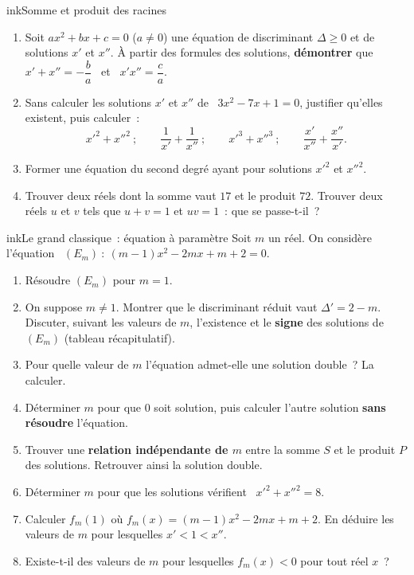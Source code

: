 \begin{exo}{ink}{Somme et produit des racines \demo\ }
\begin{enumerate}
  \item Soit $ax^2+bx+c=0$ ($a\neq0$) une équation de discriminant $\Delta\geq0$ et de solutions $x'$ et $x''$. À partir des formules des solutions, \textbf{démontrer} que \ $x'+x''=-\dfrac ba$ \ et \ $x'x''=\dfrac ca$.
  \item Sans calculer les solutions $x'$ et $x''$ de \ $3x^2-7x+1=0$, justifier qu'elles existent, puis calculer~:
  \[ x'^2+x''^2\ ;\qquad \frac1{x'}+\frac1{x''}\ ;\qquad x'^3+x''^3\ ;\qquad \frac{x'}{x''}+\frac{x''}{x'}. \]
  \item Former une équation du second degré ayant pour solutions $x'^2$ et $x''^2$.
  \item Trouver deux réels dont la somme vaut $17$ et le produit $72$. Trouver deux réels $u$ et $v$ tels que $u+v=1$ et $uv=1$~: que se passe-t-il~?
\end{enumerate}
\end{exo}

\begin{exo}{ink}{Le grand classique~: équation à paramètre }
Soit $m$ un réel. On considère l'équation \ $(E_m)~:\ (m-1)x^2-2mx+m+2=0$.
\begin{enumerate}
  \item Résoudre $(E_m)$ pour $m=1$.
  \item On suppose $m\neq1$. Montrer que le discriminant réduit vaut $\Delta'=2-m$. Discuter, suivant les valeurs de $m$, l'existence et le \textbf{signe} des solutions de $(E_m)$ (tableau récapitulatif).
  \item Pour quelle valeur de $m$ l'équation admet-elle une solution double~? La calculer.
  \item Déterminer $m$ pour que $0$ soit solution, puis calculer l'autre solution \textbf{sans résoudre} l'équation.
  \item Trouver une \textbf{relation indépendante de $m$} entre la somme $S$ et le produit $P$ des solutions. Retrouver ainsi la solution double.
  \item Déterminer $m$ pour que les solutions vérifient \ $x'^2+x''^2=8$.
  \item Calculer $f_m(1)$ où $f_m(x)=(m-1)x^2-2mx+m+2$. En déduire les valeurs de $m$ pour lesquelles $x'<1<x''$.
  \item Existe-t-il des valeurs de $m$ pour lesquelles $f_m(x)<0$ pour tout réel $x$~?
\end{enumerate}
\end{exo}

